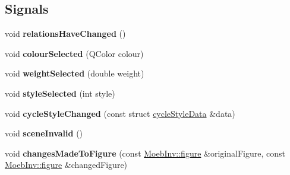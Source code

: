 \subsection*{Signals}
\begin{DoxyCompactItemize}
\item 
\mbox{\label{classcycle_context_menu_a42d360ffa2a047c3f43ded9fcec5982b}} 
void {\bfseries relations\+Have\+Changed} ()
\item 
\mbox{\label{classcycle_context_menu_acd8ba953b7b1edfac94b5ba4158217af}} 
void {\bfseries colour\+Selected} (Q\+Color colour)
\item 
\mbox{\label{classcycle_context_menu_ac91d09b750dfeace9334b67649fbbda0}} 
void {\bfseries weight\+Selected} (double weight)
\item 
\mbox{\label{classcycle_context_menu_a31b1b2e1f6596697cdac2cf0cb66359e}} 
void {\bfseries style\+Selected} (int style)
\item 
\mbox{\label{classcycle_context_menu_a2c39108d7f85f828d0af0ab4db999514}} 
void {\bfseries cycle\+Style\+Changed} (const struct \mbox{\hyperlink{structcycle_style_data}{cycle\+Style\+Data}} \&data)
\item 
\mbox{\label{classcycle_context_menu_a0e28f14e9918aef074523854b5364c3e}} 
void {\bfseries scene\+Invalid} ()
\item 
\mbox{\label{classcycle_context_menu_a6b92c1d84f101c8386d1152b680247ff}} 
void {\bfseries changes\+Made\+To\+Figure} (const \mbox{\hyperlink{class_moeb_inv_1_1figure}{Moeb\+Inv\+::figure}} \&original\+Figure, const \mbox{\hyperlink{class_moeb_inv_1_1figure}{Moeb\+Inv\+::figure}} \&changed\+Figure)
\end{DoxyCompactItemize}
